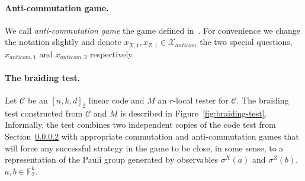 \documentclass[11pt]{article}
\theoremstyle{definition}
\newcommand{\code}{\mathcal{C}}
\newcommand{\F}{\ensuremath{\mathbb{F}}}
\newcommand{\mX}{\ensuremath{\mathcal{X}}}
\begin{document}
\paragraph{Anti-commutation game.}
We call \emph{anti-commutation game} the game defined in~\cite[Section 3.2]{de2022spectral}. For convenience we change the notation slightly and  denote $x_{X,1}, x_{Z,1} \in \mX_{anticom}$ the two special questions, $x_{anticom,1}$ and $x_{anticom,2}$ respectively. 

\paragraph{The braiding test.}
Let $\code$ be an $[n,k,d]_2$ linear code and $M$ an $r$-local tester for $\code$. The braiding test constructed from $\code$ and $M$ is described in Figure~\ref{fig:braiding-test}. Informally, the test combines two independent copies of the code test from Section~\ref{} with appropriate commutation and anti-commutation games that will force any successful strategy in the game to be close, in some sense, to a representation of the Pauli group generated by observables $\sigma^X(a)$ and $\sigma^Z(b)$, $a,b\in \F_2^k$. 
\end{document}
